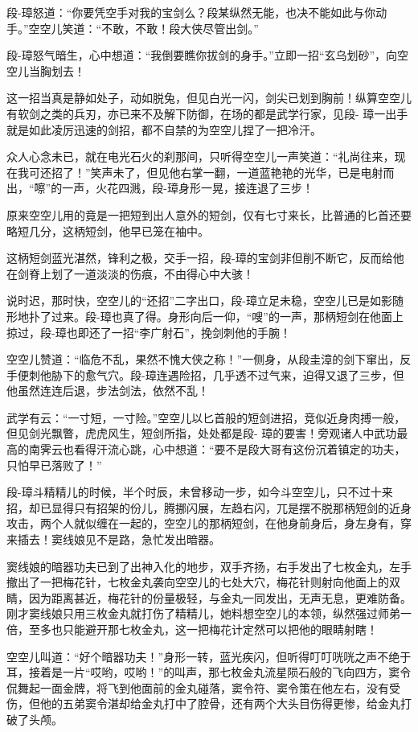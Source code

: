 \documentclass[12pt,oneside]{book}
\begin{document}
段-璋怒道：``你要凭空手对我的宝剑么？段某纵然无能，也决不能如此与你动手。''空空儿笑道：``不敢，不敢！段大侠尽管出剑。''

段-璋怒气暗生，心中想道：``我倒要瞧你拔剑的身手。''立即一招``玄乌划砂''，向空空儿当胸划去！

这一招当真是静如处子，动如脱兔，但见白光一闪，剑尖已划到胸前！纵算空空儿有软剑之类的兵刃，亦已来不及解下防御，在场的都是武学行家，见段-
璋一出手就是如此凌厉迅速的剑招，都不自禁的为空空儿捏了一把冷汗。

众人心念未已，就在电光石火的刹那间，只听得空空儿一声笑道：``礼尚往来，现在我可还招了！''笑声未了，但见他右掌一翻，一道蓝艳艳的光华，已是电射而出，``嚓''的一声，火花四溅，段-璋身形一晃，接连退了三步！

原来空空儿用的竟是一把短到出人意外的短剑，仅有七寸来长，比普通的匕首还要略短几分，这柄短剑，他早已笼在袖中。

这柄短剑蓝光湛然，锋利之极，交手一招，段-璋的宝剑非但削不断它，反而给他在剑脊上划了一道淡淡的伤痕，不由得心中大骇！

说时迟，那时快，空空儿的``还招''二字出口，段-璋立足未稳，空空儿已是如影随形地扑了过来。段-璋也真了得。身形向后一仰，``嗖''的一声，那柄短剑在他面上掠过，段-璋也即还了一招``李广射石''，挽剑刺他的手腕！

空空儿赞道：``临危不乱，果然不愧大侠之称！''一侧身，从段圭漳的剑下窜出，反手便刺他胁下的愈气穴。段-璋连遇险招，几乎透不过气来，迫得又退了三步，但他虽然连连后退，步法剑法，依然不乱！

武学有云：``一寸短，一寸险。''空空儿以匕首般的短剑进招，竞似近身肉搏一般，但见剑光飘瞥，虎虎风生，短剑所指，处处都是段-
璋的要害！旁观诸人中武功最高的南霁云也看得汗流心跳，心中想道：``要不是段大哥有这份沉着镇定的功夫，只怕早已落败了！''

段-璋斗精精儿的时候，半个时辰，未曾移动一步，如今斗空空儿，只不过十来招，却已显得只有招架的份儿，腾挪闪展，左趋右闪，兀是摆不脱那柄短剑的近身攻击，两个人就似缠在一起的，空空儿的那柄短剑，在他身前身后，身左身有，穿来插去！窦线娘见不是路，急忙发出暗器。

窦线娘的暗器功夫已到了出神入化的地步，双手齐扬，右手发出了七枚金丸，左手撤出了一把梅花针，七枚金丸袭向空空儿的七处大穴，梅花针则射向他面上的双睛，因为距离甚近，梅花针的份量极轻，与金丸一同发出，无声无息，更难防备。刚才窦线娘只用三枚金丸就打伤了精精儿，她料想空空儿的本领，纵然强过师弟一倍，至多也只能避开那七枚金丸，这一把梅花计定然可以把他的眼睛射瞎！

空空儿叫道：``好个暗器功夫！''身形一转，蓝光疾闪，但听得叮叮咣咣之声不绝于耳，接着是一片``哎哟，哎哟！''的叫声，那七枚金丸流星陨石般的飞向四方，窦令侃舞起一面金牌，将飞到他面前的金丸碰落，窦令符、窦令策在他左右，没有受伤，但他的五弟窦令湛却给金丸打中了腔骨，还有两个大头目伤得更惨，给金丸打破了头颅。
\end{document}
